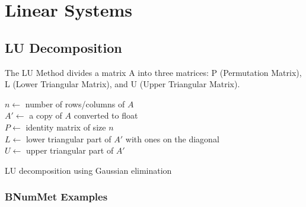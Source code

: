 \section*{Linear Systems}
\subsection*{LU Decomposition}
The LU Method divides a matrix A into three matrices: P (Permutation Matrix), L (Lower Triangular Matrix), and U (Upper Triangular Matrix).
\begin{algorithm}[H]
\label{alg:LU decomposition using Gaussian elimination}
    \SetAlgoLined
    $n \gets$ number of rows/columns of $A$ \\
    $A' \gets$ a copy of $A$ converted to float \\
    $P \gets$ identity matrix of size $n$ \\
    $L \gets$ lower triangular part of $A'$ with ones on the diagonal \\
    $U \gets$ upper triangular part of $A'$ \\
    \caption{LU decomposition using Gaussian elimination}
    
\end{algorithm}
\subsubsection*{BNumMet Examples}



